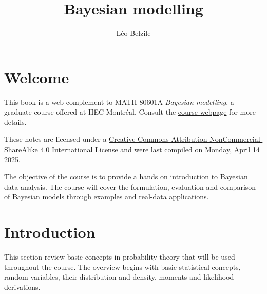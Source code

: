 \documentclass[
  11pt,
  letterpaper,
]{scrbook}
\title{Bayesian modelling}
\author{Léo Belzile}
\date{}
\renewcommand*\contentsname{Table of contents}
\newcommand\contentsname{Table of contents}
\theoremstyle{plain}
\theoremstyle{plain}
\theoremstyle{definition}
\theoremstyle{definition}
\theoremstyle{definition}
\theoremstyle{plain}
\theoremstyle{remark}
\begin{document}
\frontmatter
\maketitle

\renewcommand*\contentsname{Table of contents}
{
\setcounter{tocdepth}{2}
\tableofcontents
}

\mainmatter
{}

\chapter*{Welcome}\label{welcome}


This book is a web complement to MATH 80601A \emph{Bayesian modelling},
a graduate course offered at HEC Montréal. Consult the
\href{https://lbelzile.github.io/bayesmod}{course webpage} for more
details.

These notes are licensed under a
\href{http://creativecommons.org/licenses/by-nc-sa/4.0/}{Creative
Commons Attribution-NonCommercial-ShareAlike 4.0 International License}
and were last compiled on Monday, April 14 2025.

The objective of the course is to provide a hands on introduction to
Bayesian data analysis. The course will cover the formulation,
evaluation and comparison of Bayesian models through examples and
real-data applications.


\chapter{Introduction}\label{introduction}

This section review basic concepts in probability theory that will be
used throughout the course. The overview begins with basic statistical
concepts, random variables, their distribution and density, moments and
likelihood derivations.
\end{document}
